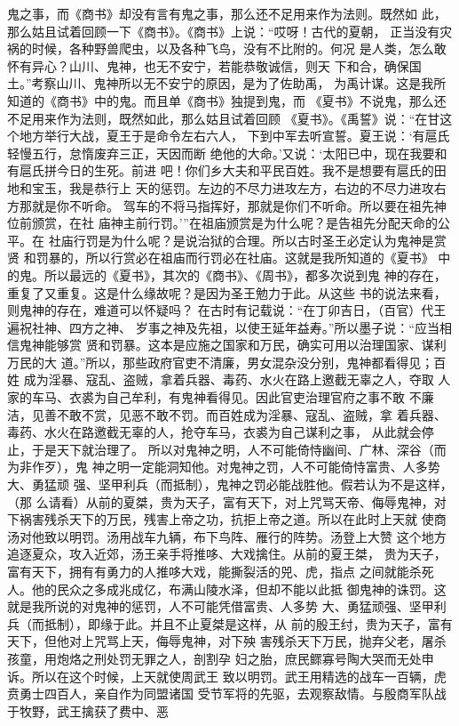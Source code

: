 \documentclass[12pt,UTF8]{ctexbook}
\begin{document}
鬼之事，而《商书》却没有言有鬼之事，那么还不足用来作为法则。既然如 
此，那么姑且试着回顾一下《商书》。《商书》上说：“哎呀！古代的夏朝， 
正当没有灾祸的时候，各种野兽爬虫，以及各种飞鸟，没有不比附的。何况 
是人类，怎么敢怀有异心？山川、鬼神，也无不安宁，若能恭敬诚信，则天 
下和合，确保国土。”考察山川、鬼神所以无不安宁的原因，是为了佐助禹， 
为禹计谋。这是我所知道的《商书》中的鬼。而且单《商书》独提到鬼，而 
《夏书》不说鬼，那么还不足用来作为法则，既然如此，那么姑且试着回顾 
《夏书》。《禹誓》说：“在甘这个地方举行大战，夏王于是命令左右六人， 
下到中军去听宣誓。夏王说：‘有扈氏轻慢五行，怠惰废弃三正，天因而断 
绝他的大命。’又说：‘太阳已中，现在我要和有扈氏拼今日的生死。前进 
吧！你们乡大夫和平民百姓。我不是想要有扈氏的田地和宝玉，我是恭行上 
天的惩罚。左边的不尽力进攻左方，右边的不尽力进攻右方那就是你不听命。 
驾车的不将马指挥好，那就是你们不听命。所以要在祖先神位前颁赏，在社 
庙神主前行罚。’”在祖庙颁赏是为什么呢？是告祖先分配天命的公平。在 
社庙行罚是为什么呢？是说治狱的合理。所以古时圣王必定认为鬼神是赏贤 
和罚暴的，所以行赏必在祖庙而行罚必在社庙。这就是我所知道的《夏书》 
中的鬼。所以最远的《夏书》，其次的《商书》、《周书》，都多次说到鬼 
神的存在，重复了又重复。这是什么缘故呢？是因为圣王勉力于此。从这些 
书的说法来看，则鬼神的存在，难道可以怀疑吗？ 
在古时有记载说：“在丁卯吉日，（百官）代王遍祝社神、四方之神、 
岁事之神及先祖，以使王延年益寿。”所以墨子说：“应当相信鬼神能够赏 
贤和罚暴。这本是应施之国家和万民，确实可用以治理国家、谋利万民的大 
道。”所以，那些政府官吏不清廉，男女混杂没分别，鬼神都看得见；百姓 
成为淫暴、寇乱、盗贼，拿着兵器、毒药、水火在路上邀截无辜之人，夺取 
人家的车马、衣裘为自己牟利，有鬼神看得见。因此官吏治理官府之事不敢 
不廉洁，见善不敢不赏，见恶不敢不罚。而百姓成为淫暴、寇乱、盗贼，拿 
着兵器、毒药、水火在路邀截无辜的人，抢夺车马，衣裘为自己谋利之事， 
从此就会停止，于是天下就治理了。 
所以对鬼神之明，人不可能倚恃幽间、广林、深谷（而为非作歹），鬼 
神之明一定能洞知他。对鬼神之罚，人不可能倚恃富贵、人多势大、勇猛顽 
强、坚甲利兵（而抵制），鬼神之罚必能战胜他。假若认为不是这样，（那 
么请看）从前的夏桀，贵为天子，富有天下，对上咒骂天帝、侮辱鬼神，对 
下祸害残杀天下的万民，残害上帝之功，抗拒上帝之道。所以在此时上天就 
使商汤对他致以明罚。汤用战车九辆，布下鸟阵、雁行的阵势。汤登上大赞 
这个地方追逐夏众，攻入近郊，汤王亲手将推哆、大戏擒住。从前的夏王桀， 
贵为天子，富有天下，拥有有勇力的人推哆大戏，能撕裂活的兕、虎，指点 
之间就能杀死人。他的民众之多成兆成亿，布满山陵水泽，但却不能以此抵 
御鬼神的诛罚。这就是我所说的对鬼神的惩罚，人不可能凭借富贵、人多势 
大、勇猛顽强、坚甲利兵（而抵制），即缘于此。并且不止夏桀是这样，从 
前的殷王纣，贵为天子，富有天下，但他对上咒骂上天，侮辱鬼神，对下殃 
害残杀天下万民，抛弃父老，屠杀孩童，用炮烙之刑处罚无罪之人，剖割孕 
妇之胎，庶民鳏寡号陶大哭而无处申诉。所以在这个时候，上天就使周武王 
致以明罚。武王用精选的战车一百辆，虎贲勇士四百人，亲自作为同盟诸国 
受节军将的先驱，去观察敌情。与殷商军队战于牧野，武王擒获了费中、恶 
\end{document}
